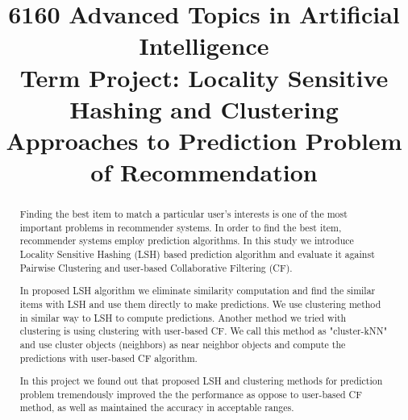 \documentclass[conference]{IEEEtran}
\begin{document}
%
\title {6160 Advanced Topics in Artificial Intelligence \\Term Project: Locality Sensitive Hashing and Clustering Approaches to Prediction Problem of Recommendation}

\author{
 }



% 




\maketitle


\begin{abstract}
Finding the best item  to match a particular user's interests is one of the 
most important problems in recommender systems. In order to find the best item,
recommender systems employ prediction algorithms. In this study we introduce 
Locality Sensitive Hashing (LSH) based prediction algorithm and evaluate it 
against Pairwise Clustering and user-based Collaborative Filtering (CF).

In proposed LSH algorithm we eliminate similarity computation and find the 
similar items with LSH and use them directly to make predictions. We use 
clustering method in similar way to LSH to compute predictions. Another method 
we tried with clustering is using clustering with user-based CF. We call this 
method as "cluster-kNN" and use cluster objects (neighbors) as near neighbor 
objects and compute the predictions with user-based CF algorithm.

In this project we found out that proposed LSH and clustering methods for 
prediction problem tremendously improved the the performance as oppose to 
user-based CF method, as well as maintained the accuracy in acceptable ranges. 

\end{abstract}
\end{document}
